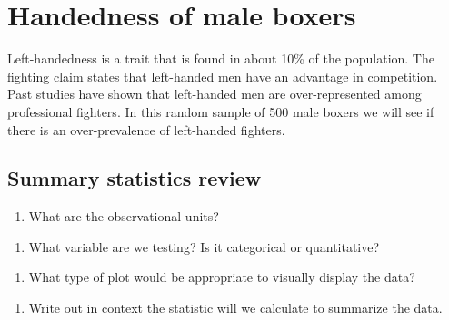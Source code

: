\documentclass[
]{report}
\providecommand{\tightlist}{%
  \setlength{\itemsep}{0pt}\setlength{\parskip}{0pt}}
\begin{document}
\hypertarget{handedness-of-male-boxers-1}{%
\section{Handedness of male boxers}\label{handedness-of-male-boxers-1}}

Left-handedness is a trait that is found in about 10\% of the population. The fighting claim states that left-handed men have an advantage in competition. Past studies have shown that left-handed men are over-represented among professional fighters. In this random sample of 500 male boxers we will see if there is an over-prevalence of left-handed fighters.

\hypertarget{summary-statistics-review}{%
\subsection{Summary statistics review}\label{summary-statistics-review}}

\begin{enumerate}
\def\labelenumi{\arabic{enumi}.}
\tightlist
\item
  What are the observational units?
\end{enumerate}

\vspace{0.5in}

\begin{enumerate}
\def\labelenumi{\arabic{enumi}.}
\setcounter{enumi}{1}
\tightlist
\item
  What variable are we testing? Is it categorical or quantitative?
\end{enumerate}

\vspace{0.5in}

\begin{enumerate}
\def\labelenumi{\arabic{enumi}.}
\setcounter{enumi}{2}
\tightlist
\item
  What type of plot would be appropriate to visually display the data?
\end{enumerate}

\vspace{0.5in}

\begin{enumerate}
\def\labelenumi{\arabic{enumi}.}
\setcounter{enumi}{3}
\tightlist
\item
  Write out in context the statistic will we calculate to summarize the data.
\end{enumerate}
\end{document}
